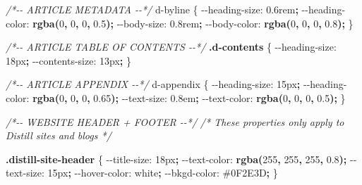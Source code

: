 \documentclass[
]{book}
\newenvironment{Shaded}{\begin{snugshade}}{\end{snugshade}}
\newcommand{\CommentTok}[1]{\textcolor[rgb]{0.56,0.35,0.01}{\textit{#1}}}
\newcommand{\ConstantTok}[1]{\textcolor[rgb]{0.56,0.35,0.01}{#1}}
\newcommand{\DataTypeTok}[1]{\textcolor[rgb]{0.13,0.29,0.53}{#1}}
\newcommand{\DecValTok}[1]{\textcolor[rgb]{0.00,0.00,0.81}{#1}}
\newcommand{\FunctionTok}[1]{\textcolor[rgb]{0.13,0.29,0.53}{\textbf{#1}}}
\newcommand{\NormalTok}[1]{#1}
\newcommand{\OperatorTok}[1]{\textcolor[rgb]{0.81,0.36,0.00}{\textbf{#1}}}
\newcommand{\VariableTok}[1]{\textcolor[rgb]{0.00,0.00,0.00}{#1}}
\begin{document}
\begin{Shaded}
\begin{Highlighting}[]
\CommentTok{/*{-}{-} ARTICLE METADATA {-}{-}*/}
\NormalTok{d{-}byline \{}
  \VariableTok{{-}{-}heading{-}size}\NormalTok{:    }\DecValTok{0.6}\DataTypeTok{rem}\OperatorTok{;}
  \VariableTok{{-}{-}heading{-}color}\NormalTok{:   }\FunctionTok{rgba(}\DecValTok{0}\OperatorTok{,} \DecValTok{0}\OperatorTok{,} \DecValTok{0}\OperatorTok{,} \DecValTok{0.5}\FunctionTok{)}\OperatorTok{;}
  \VariableTok{{-}{-}body{-}size}\NormalTok{:       }\DecValTok{0.8}\DataTypeTok{rem}\OperatorTok{;}
  \VariableTok{{-}{-}body{-}color}\NormalTok{:      }\FunctionTok{rgba(}\DecValTok{0}\OperatorTok{,} \DecValTok{0}\OperatorTok{,} \DecValTok{0}\OperatorTok{,} \DecValTok{0.8}\FunctionTok{)}\OperatorTok{;}
\NormalTok{\}}

\CommentTok{/*{-}{-} ARTICLE TABLE OF CONTENTS {-}{-}*/}
\FunctionTok{.d{-}contents}\NormalTok{ \{}
  \VariableTok{{-}{-}heading{-}size}\NormalTok{:    }\DecValTok{18}\DataTypeTok{px}\OperatorTok{;}
  \VariableTok{{-}{-}contents{-}size}\NormalTok{:   }\DecValTok{13}\DataTypeTok{px}\OperatorTok{;}
\NormalTok{\}}

\CommentTok{/*{-}{-} ARTICLE APPENDIX {-}{-}*/}
\NormalTok{d{-}appendix \{}
  \VariableTok{{-}{-}heading{-}size}\NormalTok{:    }\DecValTok{15}\DataTypeTok{px}\OperatorTok{;}
  \VariableTok{{-}{-}heading{-}color}\NormalTok{:   }\FunctionTok{rgba(}\DecValTok{0}\OperatorTok{,} \DecValTok{0}\OperatorTok{,} \DecValTok{0}\OperatorTok{,} \DecValTok{0.65}\FunctionTok{)}\OperatorTok{;}
  \VariableTok{{-}{-}text{-}size}\NormalTok{:       }\DecValTok{0.8}\DataTypeTok{em}\OperatorTok{;}
  \VariableTok{{-}{-}text{-}color}\NormalTok{:      }\FunctionTok{rgba(}\DecValTok{0}\OperatorTok{,} \DecValTok{0}\OperatorTok{,} \DecValTok{0}\OperatorTok{,} \DecValTok{0.5}\FunctionTok{)}\OperatorTok{;}
\NormalTok{\}}

\CommentTok{/*{-}{-} WEBSITE HEADER + FOOTER {-}{-}*/}
\CommentTok{/* These properties only apply to Distill sites and blogs  */}

\FunctionTok{.distill{-}site{-}header}\NormalTok{ \{}
  \VariableTok{{-}{-}title{-}size}\NormalTok{:       }\DecValTok{18}\DataTypeTok{px}\OperatorTok{;}
  \VariableTok{{-}{-}text{-}color}\NormalTok{:       }\FunctionTok{rgba(}\DecValTok{255}\OperatorTok{,} \DecValTok{255}\OperatorTok{,} \DecValTok{255}\OperatorTok{,} \DecValTok{0.8}\FunctionTok{)}\OperatorTok{;}
  \VariableTok{{-}{-}text{-}size}\NormalTok{:        }\DecValTok{15}\DataTypeTok{px}\OperatorTok{;}
  \VariableTok{{-}{-}hover{-}color}\NormalTok{:      }\ConstantTok{white}\OperatorTok{;}
  \VariableTok{{-}{-}bkgd{-}color}\NormalTok{:       }\ConstantTok{\#0F2E3D}\OperatorTok{;}
\NormalTok{\}}


\end{Highlighting}
\end{Shaded}
\end{document}
